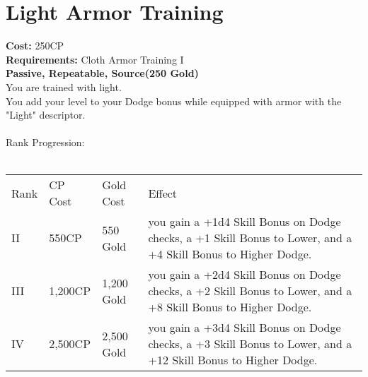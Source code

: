 \section{Light Armor Training}\label{perk:lightArmorTraining}
\textbf{Cost:} 250CP\\
\textbf{Requirements:} Cloth Armor Training I\\
\textbf{Passive, Repeatable, Source(250 Gold)}\\
You are trained with light.\\
You add your level to your Dodge bonus while equipped with armor with the "Light" descriptor.\\
\\

Rank Progression:\\
\\
\begin{tabular}{l | l | l | l}
	Rank & CP Cost & Gold Cost & Effect\\
	II & 550CP & 550 Gold & you gain a +1d4 Skill Bonus on Dodge checks, a +1 Skill Bonus to Lower, and a +4 Skill Bonus to Higher Dodge.\\
	III & 1,200CP & 1,200 Gold & you gain a +2d4 Skill Bonus on Dodge checks, a +2 Skill Bonus to Lower, and a +8 Skill Bonus to Higher Dodge.\\
	IV & 2,500CP & 2,500 Gold & you gain a +3d4 Skill Bonus on Dodge checks, a +3 Skill Bonus to Lower, and a +12 Skill Bonus to Higher Dodge.\\
\end{tabular}
